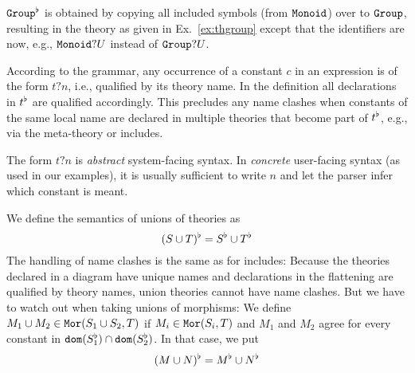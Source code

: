 \begin{example}
$\operatorname{\mathtt{Group}}^\flat$ is obtained by copying all included symbols (from $\operatorname{\mathtt{Monoid}}$) over to $\operatorname{\mathtt{Group}}$, resulting in the theory as given in Ex.~\ref{ex:thgroup} except that the identifiers are now, e.g., $\operatorname{\mathtt{Monoid}}?U$ instead of $\operatorname{\mathtt{Group}}?U$.
\end{example}

\begin{remark}
According to the grammar, any occurrence of a constant $c$ in an expression is of the form $t?n$, i.e., qualified by its theory name.
In the definition all declarations in $t^\flat$ are qualified accordingly.
This precludes any name clashes when constants of the same local name are declared in multiple theories that become part of $t^\flat$, e.g., via the meta-theory or includes.

The form $t?n$ is \emph{abstract} system-facing syntax.
In \emph{concrete} user-facing syntax (as used in our examples), it is usually sufficient to write $n$ and let the \mmt parser infer which constant is meant.
\end{remark}

\begin{union}
\begin{example}\label{sem:union}
We define the semantics of unions of theories as
\[(S\cup T)^\flat=S^\flat\cup T^\flat\]
The handling of name clashes is the same as for includes:
Because the theories declared in a diagram have unique names and declarations in the flattening are qualified by theory names, union theories cannot have name clashes.
But we have to watch out when taking unions of morphisms:
We define $M_1\cup M_2\in \mathtt{Mor}(S_1\cup S_2,T)$ if $M_i\in\mathtt{Mor}(S_i,T)$ and $M_1$ and $M_2$ agree for every constant in $\mathtt{dom}(S_1^\flat)\cap\mathtt{dom}(S_2^\flat)$.
In that case, we put
\[(M\cup N)^\flat=M^\flat\cup N^\flat\]
\end{example}
\end{union}



